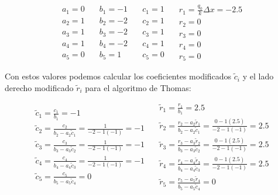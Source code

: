 \documentclass[11pt,a4paper]{article}
\begin{document}
\begin{equation}
  \begin{array}{l}
    a_1 = 0 \\
    a_2 = 1 \\
    a_3 = 1 \\
    a_4 = 1 \\
    a_5 = 0
  \end{array} \quad
  \begin{array}{l}
    b_1 = -1 \\
    b_2 = -2 \\
    b_3 = -2 \\
    b_4 = -2 \\
    b_5 = 1
  \end{array} \quad
  \begin{array}{l}
    c_1 = 1 \\
    c_2 = 1 \\
    c_3 = 1 \\
    c_4 = 1 \\
    c_5 = 0
  \end{array} \quad 
  \begin{array}{l}
    r_1 = \frac{q_0}{k} \Delta x = -2\textrm{.}5\\
    r_2 = 0 \\
    r_3 = 0 \\
    r_4 = 0 \\
    r_5 = 0
  \end{array}
\end{equation}

Con estos valores podemos calcular los coeficientes modificados $\tilde{c}_i$ y 
el lado derecho modificado $\tilde{r}_i$ para el algoritmo de Thomas:

\begin{equation}
\begin{array}{l}
\tilde{c}_1 = \frac{c_1}{b_1} = -1 \\
\tilde{c}_2 = \frac{c_2}{b_2 - a_2 \tilde{c}_1} = \frac{1}{-2 - 1(-1)} = -1 \\
\tilde{c}_3 = \frac{c_3}{b_3 - a_3 \tilde{c}_2} = \frac{1}{-2 - 1(-1)} = -1 \\
\tilde{c}_4 = \frac{c_4}{b_4 - a_4 \tilde{c}_3} = \frac{1}{-2 - 1(-1)} = -1 \\
\tilde{c}_5 = \frac{c_5}{b_5 - a_5 \tilde{c}_4} = 0
\end{array} \quad
\begin{array}{l}
\tilde{r}_1 = \frac{r_1}{b_1} = 2\textrm{.}5 \\
\tilde{r}_2 = \frac{r_2 - a_2 \tilde{r}_1}{b_2 - a_2 \tilde{c}_1} = \frac{0 - 1(2\textrm{.}5)}{-2 - 1(-1)} = 2\textrm{.}5 \\
\tilde{r}_3 = \frac{r_3 - a_3 \tilde{r}_2}{b_3 - a_3 \tilde{c}_2} = \frac{0 - 1(2\textrm{.}5)}{-2 - 1(-1)} = 2\textrm{.}5 \\
\tilde{r}_4 = \frac{r_4 - a_4 \tilde{r}_3}{b_4 - a_4 \tilde{c}_3} = \frac{0 - 1(2\textrm{.}5)}{-2 - 1(-1)} = 2\textrm{.}5 \\
\tilde{r}_5 = \frac{r_5 - a_5 \tilde{r}_4}{b_5 - a_5 \tilde{c}_4} = 0
\end{array}
\end{equation}
\end{document}
